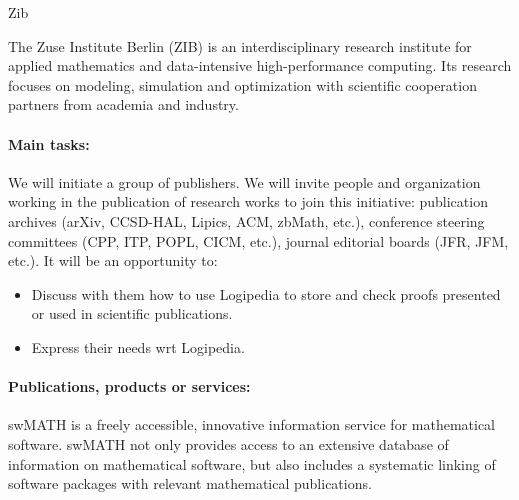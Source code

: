 \begin{sitedescription}{Zib}



The Zuse Institute Berlin (ZIB) is an interdisciplinary research institute for 
applied mathematics and data-intensive high-performance computing. 
Its research focuses on modeling, simulation and optimization with scientific 
cooperation partners from academia and industry.

\paragraph*{Main tasks:}


	We will initiate a group of publishers. We will invite
	people and organization working in the publication of research
	works to join this initiative: publication archives (arXiv, CCSD-HAL,
	Lipics, ACM, zbMath, etc.), conference steering committees (CPP,
	ITP, POPL, CICM, etc.), journal editorial boards (JFR, JFM,
	etc.). It will be an opportunity to:
	
	\begin{itemize}
		\item Discuss with them how to use Logipedia to store and check proofs presented or used in scientific publications.
		\item Express their needs wrt Logipedia.
	\end{itemize}

 


\paragraph*{Publications, products or services:}


\begin{compactitem}
\item swMATH is a freely accessible, innovative information service for mathematical software. 
                           swMATH not only provides access to an extensive database of information on mathematical software, 
                           but also includes a systematic linking of software packages with relevant mathematical publications.
\end{compactitem}


\end{sitedescription}
